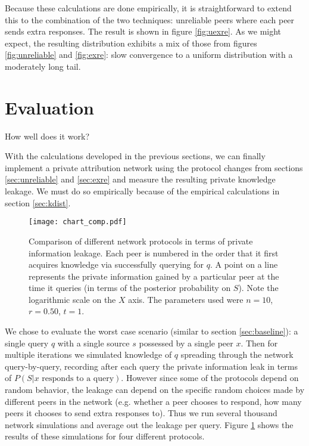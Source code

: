 \documentclass{article}
\newcommand{\secref}[1]{section \ref{sec:#1}}
\newcommand{\figref}[1]{figure \ref{fig:#1}}
\newcommand{\Figref}[1]{Figure \ref{fig:#1}}
\begin{document}
Because these calculations are done empirically, it is straightforward to extend this to
the combination of the two techniques: unreliable peers where each peer sends
extra responses. The result is shown in \figref{uexre}. As we might expect, the
resulting distribution exhibits a mix of those from figures \ref{fig:unreliable}
and \ref{fig:exre}: slow convergence to a uniform distribution with a moderately
long tail.


\section{Evaluation}\label{sec:pan}

How well does it work?

With the calculations developed in the previous sections, we can finally
implement a private attribution network using the protocol changes from sections
\ref{sec:unreliable} and \ref{sec:exre} and measure the resulting private
knowledge leakage. We must do so empirically because of the empirical
calculations in \secref{kdist}.

\begin{figure}%
    \centering
	\texttt{[image: chart\_comp.pdf]}
	\caption{Comparison of different network protocols in terms of private
	information leakage. Each peer is numbered in the order that it first
	acquires knowledge via successfully querying for $q$. A point on a line
	represents the private information gained by a particular peer at the time
	it queries (in terms of the posterior probability on $S$). Note the
	logarithmic scale on the $X$ axis. The parameters used were $n=10$,
	$r=0.50$, $t=1$.}
    \label{fig:comp}%
\end{figure}

We chose to evaluate the worst case scenario (similar to \secref{baseline}): a
single query $q$ with a single source $s$ possessed by a single peer $x$. Then
for multiple iterations we simulated knowledge of $q$ spreading through the
network query-by-query, recording after each query the private information leak
in terms of $P(S|\text{$x$ responds to a query})$. However since some of the protocols
depend on random behavior, the leakage can depend on the specific
random choices made by different peers in the network (e.g. whether a peer
chooses to respond, how many peers it chooses to send extra responses to). Thus
we run several thousand network simulations and average out the leakage per
query. \Figref{comp} shows the results of these simulations for four different
protocols.
\end{document}
